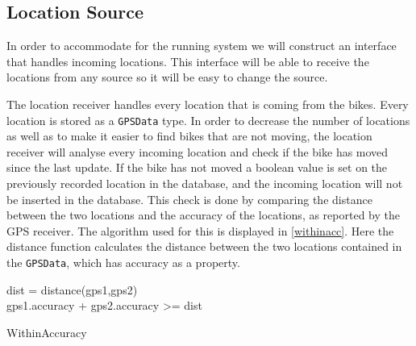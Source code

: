 \subsection{Location Source}\label{design:datareceiver}
In order to accommodate for the running system we will construct an interface that handles incoming locations.
This interface will be able to receive the locations from any source so it will be easy to change the source.

The location receiver handles every location that is coming from the bikes.
Every location is stored as a \texttt{GPSData} type.
In order to decrease the number of locations as well as to make it easier to find bikes that are not moving, the location receiver will analyse every incoming location and check if the bike has moved since the last update.
If the bike has not moved a boolean value is set on the previously recorded location in the database, and the incoming location will not be inserted in the database.
This check is done by comparing the distance between the two locations and the accuracy of the locations, as reported by the GPS receiver.
The algorithm used for this is displayed in \cref{withinacc}.
Here the distance function calculates the distance between the two locations contained in the \texttt{GPSData}, which has accuracy as a property.

\begin{algorithm}

dist = distance(gps1,gps2)\\
\Return gps1.accuracy + gps2.accuracy >= dist

\caption{WithinAccuracy}
\label{withinacc}
\end{algorithm}